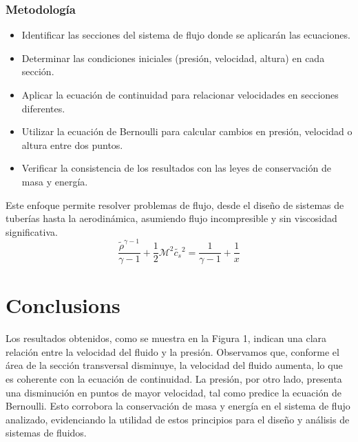 \subsubsection{Metodología}
\begin{itemize}
\item Identificar las secciones del sistema de flujo donde se aplicarán las ecuaciones.
\item Determinar las condiciones iniciales (presión, velocidad, altura) en cada sección.
\item Aplicar la ecuación de continuidad para relacionar velocidades en secciones diferentes.
\item Utilizar la ecuación de Bernoulli para calcular cambios en presión, velocidad o altura entre dos puntos.
\item Verificar la consistencia de los resultados con las leyes de conservación de masa y energía.
\end{itemize}

Este enfoque permite resolver problemas de flujo, desde el diseño de sistemas de tuberías hasta la aerodinámica, asumiendo flujo incompresible y sin viscosidad significativa.\begin{equation}\frac{\tilde{\rho }^{\gamma -1}}{\gamma -1}+\frac{1}{2} \mathcal{M}^2 \tilde{c_s}{}^2=\frac{1}{\gamma -1}+\frac{1}{x}\label{ber2}\end{equation}\section{Conclusions}
Los resultados obtenidos, como se muestra en la Figura 1, indican una clara relación entre la velocidad del fluido y la presión. Observamos que, conforme el área de la sección transversal disminuye, la velocidad del fluido aumenta, lo que es coherente con la ecuación de continuidad. La presión, por otro lado, presenta una disminución en puntos de mayor velocidad, tal como predice la ecuación de Bernoulli. Esto corrobora la conservación de masa y energía en el sistema de flujo analizado, evidenciando la utilidad de estos principios para el diseño y análisis de sistemas de fluidos.
